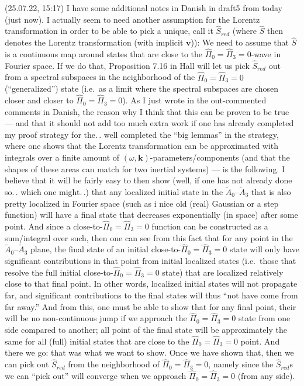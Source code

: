 \documentclass{report}
\begin{document}
(25.07.22, 15:17)
I have some additional notes in Danish in draft5 from today (just now). I actually seem to need another assumption for the Lorentz transformation in order to be able to pick a unique, call it $\hat S_{red}$ (where $\hat S$ then denotes the Lorentz transformation (with implicit $\mathbf{v}$)): We need to assume that $\hat S$ is a continuous map around states that are close to the $\hat\Pi_{0} = \hat\Pi_{3} = 0$-wave in Fourier space. If we do that, Proposition 7.16 in Hall will let us pick $\hat S_{red}$ out from a spectral subspaces in the neighborhood of the $\hat\Pi_{0} = \hat\Pi_{3} = 0$ (``generalized'') state (i.e.\ as a limit where the spectral subspaces are chosen closer and closer to $\hat\Pi_{0} = \hat\Pi_{3} = 0$). As I just wrote in the out-commented comments in Danish, the reason why I think that this can be proven to be true --- and that it should not add too much extra work if one has already completed my proof strategy for the.\,. well completed the ``big lemmas'' in the strategy, where one shows that the Lorentz transformation can be approximated with integrals over a finite amount of $(\omega, \mathbf{k})$-parameters/components (and that the shapes of these areas can match for two inertial systems) --- is the following. I believe that it will be fairly easy to then show (well, if one has not already done so.\,. which one might.\,.) that any localized initial state in the $\widetilde A_0$--$\widetilde A_3$ that is also pretty localized in Fourier space (such as i nice old (real) Gaussian or a step function) will have a final state that decreases exponentially (in space) after some point. And since a close-to-$\hat\Pi_{0} = \hat\Pi_{3} = 0$ function can be constructed as a sum/integral over such, then one can see from this fact that for any point in the $\widetilde A_0$--$\widetilde A_3$ plane, the final state of an initial close-to-$\hat\Pi_{0} = \hat\Pi_{3} = 0$ state will only have significant contributions in that point from initial localized states (i.e.\ those that resolve the full initial close-to-$\hat\Pi_{0} = \hat\Pi_{3} = 0$ state) that are localized relatively close to that final point. In other words, localized initial states will not propagate far, and significant contributions to the final states will thus ``not have come from far away.'' And from this, one must be able to show that for any final point, their will be no non-continuous jump if we approach the $\hat\Pi_{0} = \hat\Pi_{3} = 0$ state from one side compared to another; all point of the final state will be approximately the same for all (full) initial states that are close to the $\hat\Pi_{0} = \hat\Pi_{3} = 0$ point. And there we go: that was what we want to show. Once we have shown that, then we can pick out $\hat S_{red}$ from the neighborhood of $\hat\Pi_{0} = \hat\Pi_{3} = 0$, namely since the $\hat S_{red}$s we can ``pick out'' will converge when we approach $\hat\Pi_{0} = \hat\Pi_{3} = 0$ (from any side). %
\end{document}
